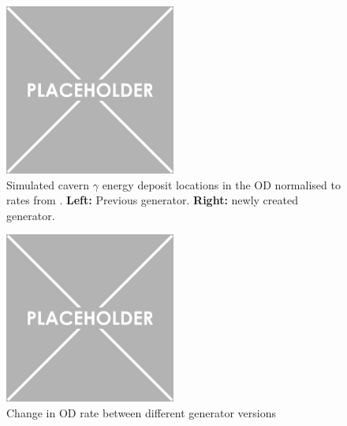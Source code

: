 \begin{figure}[!htbp]
    \centering
    \includegraphics[width=0.5\textwidth]{Figures/Placeholder.png}
    \caption{Simulated cavern $\gamma$ energy deposit locations in the OD normalised to rates from \cite{LZ_Gamma_Ray_Background_ref}. \textbf{Left:} Previous generator. \textbf{Right:} newly created generator.}
    \label{fig:cavern_gamma_position_distribution}
\end{figure}


\par


\begin{figure}[!htbp]
    \centering
    \includegraphics[width=0.5\textwidth]{Figures/Placeholder.png}
    \caption{Change in OD rate between different generator versions}
    \label{fig:cavern_gamma_rate_difference}
\end{figure}

